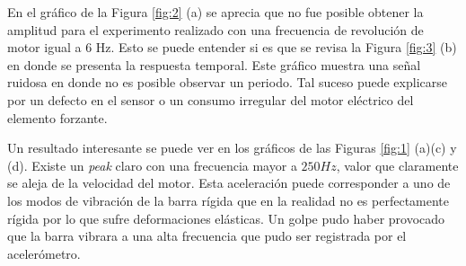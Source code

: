 \documentclass[letterpaper,11pt]{article} %
\begin{document}
En el gráfico de la Figura \ref{fig:2} (a) se aprecia que no fue posible obtener la amplitud para el experimento realizado con una frecuencia de revolución de motor igual a 6 Hz. Esto se puede entender si es que se revisa la Figura \ref{fig:3} (b) en donde se presenta la respuesta temporal.  Este gráfico muestra una señal ruidosa en donde no es posible observar un periodo. Tal suceso puede explicarse por un defecto en el sensor o un consumo irregular del motor eléctrico del elemento forzante.

Un resultado interesante se puede ver en los gráficos de las Figuras \ref{fig:1} (a)(c) y (d). Existe un {\it peak} claro con una frecuencia mayor a $250 Hz$, valor que claramente se aleja de la velocidad del motor.  Esta aceleración puede corresponder a uno de los modos de vibración de la barra rígida que en la realidad no es perfectamente rígida por lo que sufre deformaciones elásticas. Un golpe pudo haber provocado que la barra vibrara a una alta frecuencia que pudo ser registrada por el acelerómetro.
\end{document}
